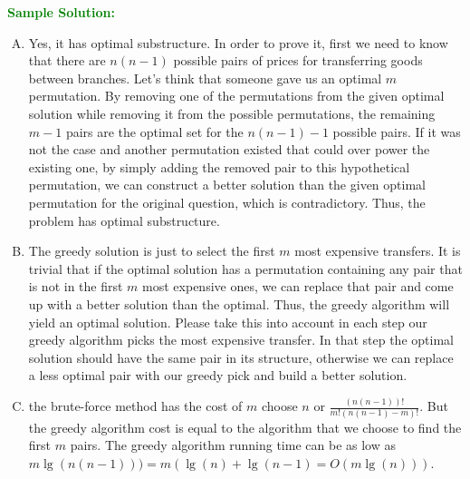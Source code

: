 \textcolor{Green}{\textbf{Sample Solution:}}
\begin{enumerate}[A.]
	\item Yes, it has optimal substructure. In order to prove it, first we need to know that there are $n(n-1)$ possible pairs of prices for transferring goods between branches. Let's think that someone gave us an optimal $m$ permutation. By removing one of the permutations from the given optimal solution while removing it from the possible permutations, the remaining $m-1$ pairs are the optimal set for the $n(n-1)-1$ possible pairs. If it was not the case and another permutation existed that could over power the existing one, by simply adding the removed pair to this hypothetical permutation, we can construct a better solution than the given optimal permutation for the original question, which is contradictory. Thus, the problem has optimal substructure.
	\item The greedy solution is just to select the first $m$ most expensive transfers. It is trivial that if the optimal solution has a permutation containing any pair that is not in the first $m$ most expensive ones, we can replace that pair and come up with a better solution than the optimal. Thus, the greedy algorithm will yield an optimal solution. Please take this into account in each step our greedy algorithm picks the most expensive transfer. In that step the optimal solution should have the same pair in its structure, otherwise we can replace a less optimal pair with our greedy pick and build a better solution.
	\item the brute-force method has the cost of $m$ choose $n$ or $\frac{(n(n-1))!}{m!(n(n-1)-m)!}$. But the greedy algorithm cost is equal to the algorithm that we choose to find the first $m$ pairs. The greedy algorithm running time can be as low as $m \lg(n(n-1))) = m(\lg(n) + \lg(n-1) = O(m\lg(n)))$.
\end{enumerate}

